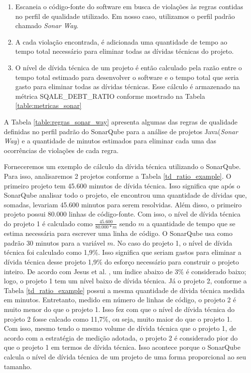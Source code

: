 \begin{enumerate}
\item Escaneia o código-fonte do software em busca de violações às regras contidas no perfil de qualidade utilizado. Em nosso caso, utilizamos o perfil padrão chamado  \textit{Sonar Way}\cite{arapidis2012sonar}.
\item A cada violação encontrada, é adicionada uma quantidade de tempo ao tempo total necessário para eliminar todas as dívidas técnicas do projeto.
\item O nível de dívida técnica de um projeto é então calculado pela razão entre o tempo total estimado para desenvolver o software  e o tempo total que seria gasto para eliminar todas as dívidas técnicas. Esse cálculo é armazenado na métrica SQALE\_DEBT\_RATIO conforme mostrado na Tabela \ref{table:metricas_sonar}
\end{enumerate}

 A Tabela \ref{table:regras_sonar_way} apresenta algumas das regras de qualidade definidas no perfil padrão do SonarQube para a análise de projetos Java(\textit{Sonar Way}) e a quantidade de minutos estimados para eliminar cada uma das ocorrências de violações de cada regra.  

Forneceremos um exemplo de cálculo da dívida técnica utilizando o SonarQube. Para isso, analisaremos 2 projetos conforme a Tabela \ref{td_ratio_example}. O primeiro projeto tem 45.600 minutos de dívida técnica. Isso significa que após o SonarQube analisar todo o projeto, ele encontrou uma quantidade de dívidas que, somadas, levariam 45.600 minutos para serem resolvidas. Além disso, o  primeiro projeto possui  80.000 linhas de código-fonte. Com isso, o nível de dívida técnica do projeto 1 é calculado como $\frac{45.600}{80.000*m}$ sendo $m$ a quantidade de tempo que se estima necessária para escrever uma linha de código. O SonarQube usa como padrão 30 minutos para a variável $m$. No caso do projeto 1, o nível de dívida técnica foi calculado como 1,9\%. Isso significa que seriam gastos para eliminar a dívida técnica desse projeto 1,9\% do esforço necessário para construir o projeto inteiro. De acordo com Jesus et al. \cite{de2017technical}, um índice abaixo de 3\% é considerado baixo; logo, o projeto 1 tem um nível baixo de dívida técnica.  Já o projeto 2, conforme a Tabela \ref{td_ratio_example} possui a mesma quantidade de dívida técnica medida em minutos. Entretanto, medido em número de linhas de código, o projeto 2 é muito menor do que o projeto 1. Isso fez com que o nível de dívida técnica do projeto 2 fosse calcado como 11,7\%, ou seja, muito maior do que o projeto 1. Com isso, mesmo tendo o mesmo volume de dívida técnica que o projeto 1, de acordo com a estratégia de medição adotada, o projeto 2 é considerado pior do que o projeto 1 em termos de dívida técnica. Isso acontece porque o SonarQube
calcula o nível de dívida técnica de um projeto de uma forma proporcional ao seu tamanho.


